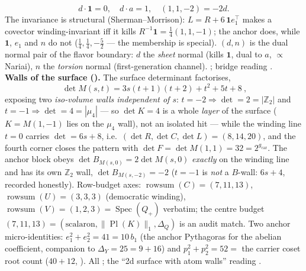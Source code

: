 \documentclass[11pt,a4paper]{article}
\newcommand{\gcar}{g_{\mathrm{car}}}
\newcommand{\Z}{\mathbb{Z}}
\theoremstyle{definition}
\begin{document}
\begin{winbox}
\[  d\cdot\mathbf 1=0,\quad d\cdot a=1,\quad (1,1,-2)=-2d .
\]
The invariance is structural (Sherman--Morrison): $L=R+6\,\mathbf 1e_1^\top$ makes a covector
winding-invariant iff it kills $R^{-1}\mathbf 1=\tfrac14(1,1,-1)$; the anchor does, while $\mathbf 1$,
$e_1$ and $n$ do not ($\tfrac14,\tfrac14,-\tfrac52$ --- the membership is special). $(d,n)$ is the dual
normal pair of the flavor boundary: $d$ the \emph{sheet} normal (kills $\mathbf 1$, dual to $a$,
$\propto$ Nariai), $n$ the \emph{torsion} normal (first-generation channel). \mE; bridge reading \mC.
\smallskip\\
\noindent\textbf{Walls of the surface ().} The surface determinant factorises,
\[
  \boxed{\ \det M(s,t)=3s(t{+}1)(t{+}2)+t^2+5t+8\ },
\]
exposing two \emph{iso-volume walls independent of $s$}: $t=-2\Rightarrow\det=2=|\Z_2|$ and
$t=-1\Rightarrow\det=4=|\mu_4|$ --- so $\det K=4$ is a whole \emph{layer} of the surface ($K=M(1,-1)$ lies
on the $\mu_4$ wall), not an isolated hit --- while the winding line $t=0$ carries $\det=6s+8$, i.e.\
$(\det R,\det C,\det L)=(8,14,20)$, and the fourth corner closes the pattern with
$\det F=\det M(1,1)=32=2^{\gcar}$. The anchor block obeys $\det B_{M(s,0)}=2\det M(s,0)$ \emph{exactly} on
the winding line and has its own $\Z_2$ wall, $\det B_{M(s,-2)}=-2$ ($t=-1$ is \emph{not} a $B$-wall:
$6s+4$, recorded honestly). Row-budget axes: $\operatorname{rowsum}(C)=(7,11,13)$,
$\operatorname{rowsum}(U)=(3,3,3)$ (democratic winding), $\operatorname{rowsum}(V)=(1,2,3)=
\operatorname{Spec}(Q_+)$ verbatim; the centre budget $(7,11,13)=(\text{scalaron},\|\operatorname{Pl}(K)\|_1,
\Delta_Q)$ is an audit match. Two anchor micro-identities: $e_1^2+e_2^2=41=10\,b_1$ (the anchor Pythagoras
for the abelian coefficient, companion to $\Delta_Y=25=9{+}16$) and $p_1^2+p_2^2=52=$ the carrier coset
root count ($40{+}12$, \veri{v128\_graded\_hull.py}). All \mE; the ``2d surface with atom walls'' reading \mC.
\end{winbox}
\end{document}
